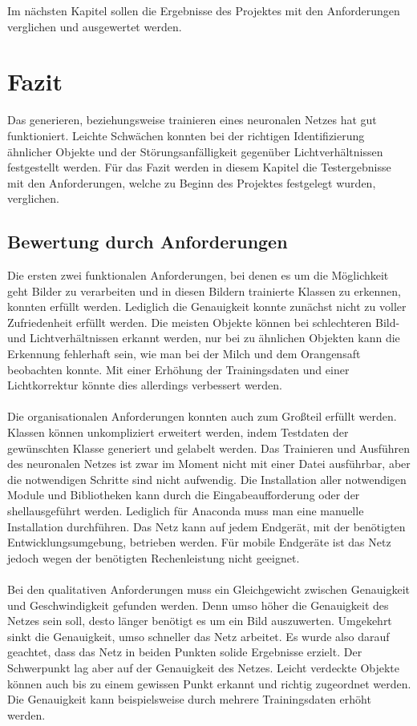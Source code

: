 \documentclass[a4paper,12pt,oneside]{article}
\begin{document}
Im nächsten Kapitel sollen die Ergebnisse des Projektes mit den Anforderungen verglichen und ausgewertet werden.

\newpage

\section{Fazit}
Das generieren, beziehungsweise trainieren eines neuronalen Netzes hat gut funktioniert. Leichte Schwächen konnten bei der richtigen Identifizierung ähnlicher Objekte und der Störungsanfälligkeit gegenüber Lichtverhältnissen festgestellt werden. Für das Fazit werden in diesem Kapitel die Testergebnisse mit den Anforderungen, welche zu Beginn des Projektes festgelegt wurden, verglichen.\\

\subsection{Bewertung durch Anforderungen}

Die ersten zwei funktionalen Anforderungen, bei denen es um die Möglichkeit geht Bilder zu verarbeiten und in diesen Bildern trainierte Klassen zu erkennen, konnten erfüllt werden. Lediglich die Genauigkeit konnte zunächst nicht zu voller Zufriedenheit erfüllt werden. Die meisten Objekte können bei schlechteren Bild- und Lichtverhältnissen erkannt werden, nur bei zu ähnlichen Objekten kann die Erkennung fehlerhaft sein, wie man bei der Milch und dem Orangensaft beobachten konnte. Mit einer Erhöhung der Trainingsdaten und einer Lichtkorrektur könnte dies allerdings verbessert werden.\\
\\
Die organisationalen Anforderungen konnten auch zum Großteil erfüllt werden. Klassen können unkompliziert erweitert werden, indem Testdaten der gewünschten Klasse generiert und gelabelt werden. Das Trainieren und Ausführen des neuronalen Netzes ist zwar im Moment nicht mit einer Datei ausführbar, aber die notwendigen Schritte sind nicht aufwendig. Die Installation aller notwendigen Module und Bibliotheken kann durch die Eingabeaufforderung oder der \glqq shell\grqq ausgeführt werden. Lediglich für Anaconda muss man eine manuelle Installation durchführen. Das Netz kann auf jedem Endgerät, mit der benötigten Entwicklungsumgebung, betrieben werden. Für mobile Endgeräte ist das Netz jedoch wegen der benötigten Rechenleistung nicht geeignet.\\
\\
Bei den qualitativen Anforderungen muss ein Gleichgewicht zwischen Genauigkeit und Geschwindigkeit gefunden werden. Denn umso höher die Genauigkeit des Netzes sein soll, desto länger benötigt es um ein Bild auszuwerten. Umgekehrt sinkt die Genauigkeit, umso schneller das Netz arbeitet. Es wurde also darauf geachtet, dass das Netz in beiden Punkten solide Ergebnisse erzielt. Der Schwerpunkt lag aber auf der Genauigkeit des Netzes. Leicht verdeckte Objekte können auch bis zu einem gewissen Punkt erkannt und richtig zugeordnet werden. Die Genauigkeit kann beispielsweise durch mehrere Trainingsdaten erhöht werden.\\
\end{document}
